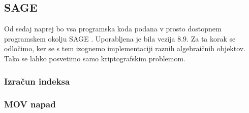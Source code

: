 \documentclass[12pt,a4paper,twoside]{article}
\newcommand{\literatura}{literatura}  %
\theoremstyle{definition} %
\theoremstyle{plain} %
\numberwithin{equation}{section}  %
\begin{document}
\subsection{SAGE}
Od sedaj naprej bo vsa programska koda podana v prosto dostopnem programskem okolju SAGE \cite{sagemath}. Uporabljena je bila vezija $8.9$. Za ta korak se odločimo, ker se s tem izognemo implementaciji raznih algebraičnih objektov. Tako se lahko posvetimo samo kriptografskim problemom.
\subsubsection{Izračun indeksa}

\subsubsection{MOV napad}








\cleardoublepage                           %

\cleardoublepage                           %
\printindex
\end{document}
